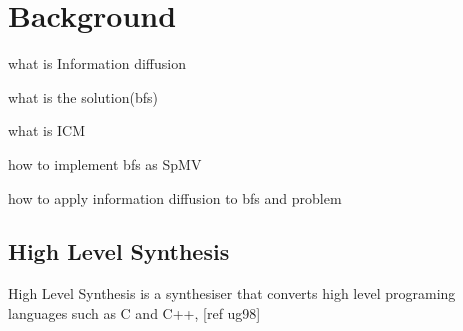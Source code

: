 \chapter{Background} \label{background}

\begin{list_type}  
\item what is Information diffusion
\item what is the solution(bfs)
\item what is ICM
\item how to implement bfs as SpMV
\item how to apply information diffusion to bfs and problem
\item 
\end{list_type}


\section{High Level Synthesis}

High Level Synthesis is a synthesiser that converts high level programing languages such as C and C++, [ref ug98]